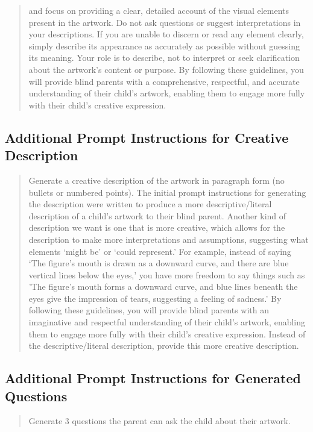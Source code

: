 \documentclass[sigconf]{acmart}
\begin{document}
\begin{quote}
and focus on providing a clear, detailed account of the visual elements present in the artwork. Do not ask questions or suggest interpretations in your descriptions. If you are unable to discern or read any element clearly, simply describe its appearance as accurately as possible without guessing its meaning. Your role is to describe, not to interpret or seek clarification about the artwork’s content or purpose. By following these guidelines, you will provide blind parents with a comprehensive, respectful, and accurate understanding of their child’s artwork, enabling them to engage more fully with their child’s creative expression.
\end{quote}

\subsection{Additional Prompt Instructions for Creative Description}
\begin{quote}
    Generate a creative description of the artwork in paragraph form (no bullets or numbered points). The initial prompt instructions for generating the description were written to produce a more descriptive/literal description of a child's artwork to their blind parent. Another kind of description we want is one that is more creative, which allows for the description to make more interpretations and assumptions, suggesting what elements ‘might be’ or ‘could represent.’ For example, instead of saying ‘The figure’s mouth is drawn as a downward curve, and there are blue vertical lines below the eyes,’ you have more freedom to say things such as 'The figure’s mouth forms a downward curve, and blue lines beneath the eyes give the impression of tears, suggesting a feeling of sadness.' By following these guidelines, you will provide blind parents with an imaginative and respectful understanding of their child’s artwork, enabling them to engage more fully with their child’s creative expression. Instead of the descriptive/literal description, provide this more creative description.
\end{quote}

\subsection{Additional Prompt Instructions for Generated Questions}

\begin{quote}
Generate 3 questions the parent can ask the child about their artwork.
\end{quote}
\end{document}
